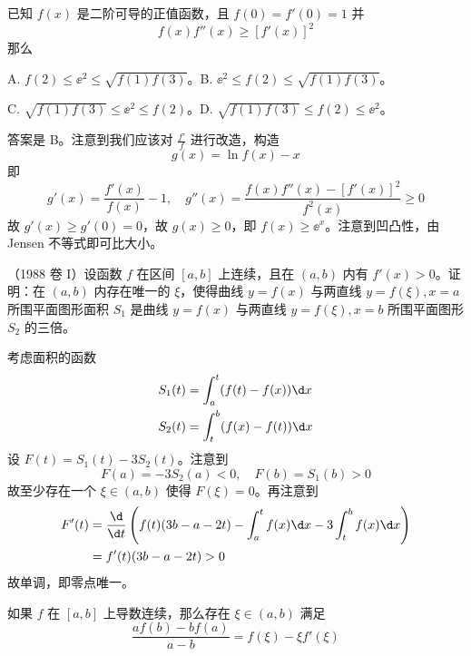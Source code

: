 \begin{problem}[000026]
已知 $f(x)$ 是二阶可导的正值函数，且 $f(0) = f'(0) = 1$ 并
\[ f(x) f''(x) \geqslant [f'(x)]^2 \]
那么

A. $f(2) \leqslant \ee^2 \leqslant \sqrt{f(1)f(3)}$。B. $\ee^2 \leqslant f(2) \leqslant \sqrt{f(1)f(3)}$。

C. $\sqrt{f(1)f(3)} \leqslant \ee^2 \leqslant f(2)$。D. $\sqrt{f(1)f(3)} \leqslant f(2) \leqslant \ee^2$。
\end{problem}

\begin{solution}
	答案是 B。注意到我们应该对 $\frac{f'}{f}$ 进行改造，构造
	\[ g(x) = \ln f(x) - x \]
	即
	\[ g'(x) = \frac{f'(x)}{f(x)} - 1, \quad g''(x) = \frac{f(x) f''(x) - [f'(x)]^2}{f^2(x)} \geqslant 0 \]
	故 $g'(x) \geqslant g'(0) = 0$，故 $g(x) \geqslant 0$，即 $f(x) \geqslant \ee^x$。注意到凹凸性，由 Jensen 不等式即可比大小。
\end{solution}

\begin{problem}[000032]
（1988 卷 I）设函数 $f$ 在区间 $[a, b]$ 上连续，且在 $(a, b)$ 内有 $f'(x) > 0$。证明：在 $(a, b)$ 内存在唯一的 $\xi$，使得曲线 $y = f(x)$ 与两直线 $y = f(\xi), x = a$ 所围平面图形面积 $S_1$ 是曲线 $y = f(x)$ 与两直线 $y = f(\xi), x = b$ 所围平面图形 $S_2$ 的三倍。
\end{problem}

\begin{solution}
	考虑面积的函数
	\[  \begin{aligned}
			S_1(t) & = \int_{a}^{t} (f(t) - f(x)) \d x \\
			S_2(t) & = \int_{t}^{b} (f(x) - f(t)) \d x
		\end{aligned} \]
	设 $F(t) = S_1(t) - 3S_2(t)$。注意到
	\[ F(a) = -3S_2(a) < 0, \quad F(b) = S_1(b) > 0 \]
	故至少存在一个 $\xi \in (a, b)$ 使得 $F(\xi) = 0$。再注意到
	\[ \begin{aligned}
			F'(t)
			 & = \frac{\d}{\d t}\left( f(t)(3b - a - 2t) - \int_{a}^{t} f(x) \d x - 3 \int_{t}^{b} f(x) \d x \right) \\
			 & = f'(t) (3b - a - 2t) > 0
		\end{aligned} \]
	故单调，即零点唯一。
\end{solution}

\begin{problem}[000033]
如果 $f$ 在 $[a, b]$ 上导数连续，那么存在 $\xi \in (a, b)$ 满足
\[ \frac{af(b) - bf(a)}{a - b} = f(\xi) - \xi f'(\xi) \]
\end{problem}

